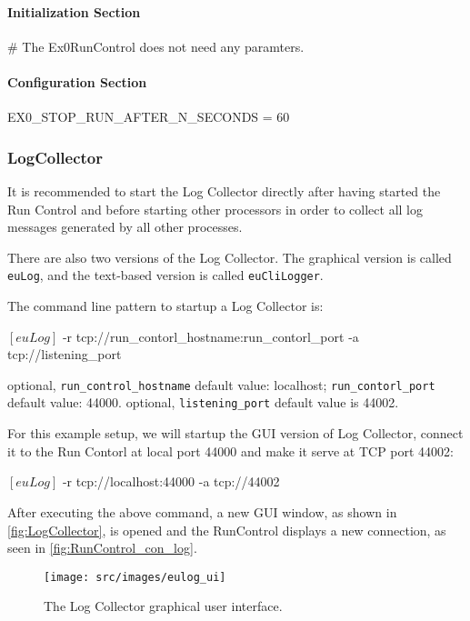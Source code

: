 \paragraph{Initialization Section}
\begin{listing}[conf]
[RunControl]
# The Ex0RunControl does not need any paramters.
\end{listing}

\paragraph{Configuration Section}
\begin{listing}[conf]
[RunControl]
EX0_STOP_RUN_AFTER_N_SECONDS = 60
\end{listing}

\subsubsection{LogCollector}
\label{sec:logcollector}
It is recommended to start the Log Collector directly after having started the Run Control and before starting other processors in order to collect all log messages generated by all other processes.

There are also two versions of the Log Collector.
The graphical version is called \texttt{euLog},
and the text-based version is called \texttt{euCliLogger}.

The command line pattern to startup a Log Collector is:
\begin{listing}[mybash]
$[euLog]$ -r tcp://{run_contorl_hostname}:{run_contorl_port} -a tcp://{listening_port}
\end{listing}

\begin{description}
optional, \texttt{run\_control\_hostname} default value: localhost;  \texttt{run\_contorl\_port}  default value: 44000.
optional, \texttt{listening\_port} default value is 44002.
\end{description}

For this example setup, we will startup the GUI version of Log Collector, connect it to the Run Contorl at local port 44000 and make it serve at TCP port 44002:\\
\begin{listing}[mybash]
$[euLog]$ -r tcp://localhost:44000 -a tcp://44002
\end{listing}

After executing the above command, a new GUI window, as shown in \autoref{fig:LogCollector}, is opened and the RunControl displays a new connection, as seen in \autoref{fig:RunControl_con_log}.
\begin{figure}[htb]
  \begin{center}
    \texttt{[image: src/images/eulog\_ui]}
    \caption{The Log Collector graphical user interface.}
    \label{fig:LogCollector}
  \end{center}
\end{figure}


